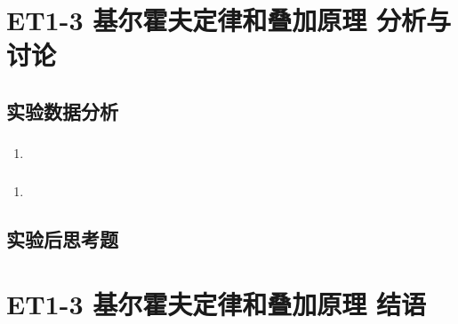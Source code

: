 \documentclass[dvipsnames, svgnames,a4paper,11pt]{article}
\begin{document}
	\section{ET1-3 基尔霍夫定律和叠加原理 \quad\heiti 分析与讨论}
	
	\subsection{实验数据分析}
	
	\subsubsection{}
	\begin{enumerate}
		\item 
	\end{enumerate}
	
	\subsubsection{}
	\begin{enumerate}
		\item 
	\end{enumerate}
	
	\subsubsection{}
	
	
	\subsection{实验后思考题}
	
	\begin{question}
		
	\end{question}
	
	\begin{question}
		
	\end{question}
	
	\begin{question}
		
	\end{question}
	
	
	
	\clearpage
	
	\section{ET1-3 基尔霍夫定律和叠加原理 \quad\heiti 结语}
	
\end{document}

